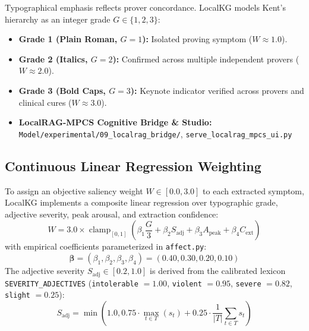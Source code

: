 \documentclass[10pt,twocolumn,letterpaper]{article}
\begin{document}
Typographical emphasis reflects prover concordance. LocalKG models Kent's hierarchy as an integer grade $G \in \{1, 2, 3\}$:
\begin{itemize}
  \item \textbf{Grade 1 (Plain Roman, $G=1$):} Isolated proving symptom ($W \approx 1.0$).
  \item \textbf{Grade 2 (Italics, $G=2$):} Confirmed across multiple independent provers ($W \approx 2.0$).
  \item \textbf{Grade 3 (Bold Caps, $G=3$):} Keynote indicator verified across provers and clinical cures ($W \approx 3.0$).
  \item \textbf{LocalRAG-MPCS Cognitive Bridge \& Studio:} \nolinkurl{Model/experimental/09_localrag_bridge/}, \nolinkurl{serve_localrag_mpcs_ui.py}
\end{itemize}

\subsection{Continuous Linear Regression Weighting}
To assign an objective saliency weight $W \in [0.0, 3.0]$ to each extracted symptom, LocalKG implements a composite linear regression over typographic grade, adjective severity, peak arousal, and extraction confidence:
\begin{equation}
  W = 3.0 \times \operatorname{clamp}_{[0, 1]}\left( \beta_1 \frac{G}{3} + \beta_2 S_{\text{adj}} + \beta_3 A_{\text{peak}} + \beta_4 C_{\text{ext}} \right)
\end{equation}
with empirical coefficients parameterized in \texttt{affect.py}:
\begin{equation}
  \boldsymbol{\beta} = (\beta_1, \beta_2, \beta_3, \beta_4) = (0.40, 0.30, 0.20, 0.10)
\end{equation}
The adjective severity $S_{\text{adj}} \in [0.2, 1.0]$ is derived from the calibrated lexicon \texttt{SEVERITY\_ADJECTIVES} (\texttt{intolerable} $= 1.00$, \texttt{violent} $= 0.95$, \texttt{severe} $= 0.82$, \texttt{slight} $= 0.25$):
\begin{equation}
  S_{\text{adj}} = \min\left(1.0, 0.75 \cdot \max_{t \in T}(s_t) + 0.25 \cdot \frac{1}{|T|}\sum_{t \in T} s_t\right)
\end{equation}
\end{document}

